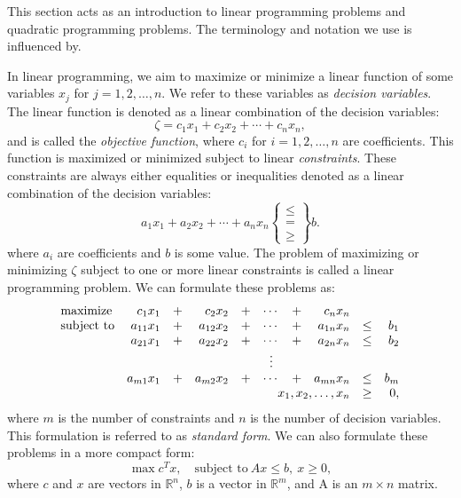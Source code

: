 This section acts as an introduction to linear programming problems and
quadratic programming problems.
The terminology and notation we use is influenced by\cite{vanderbei}.

In linear programming, we aim to maximize or minimize a linear function of
some variables $x_j$ for $j=1,2,\ldots,n$. We refer to these variables as
\textit{decision variables}. The linear function is denoted as a linear
combination of the decision variables:
\[
\zeta = c_1 x_1 + c_2 x_2 + \cdots + c_n x_n,
\]
and is called the \textit{objective function}, where $c_i$ for $i=1,2,\ldots,n$
are coefficients.
This function is maximized
or minimized subject to linear \textit{constraints}. These constraints are
always either equalities or inequalities denoted as a linear combination
of the decision variables:
\[
a_1x_1 + a_2 x_2 + \cdots + a_n x_n \left\{\begin{array}{c} \leq \\ = \\ \geq \end{array}\right\} b.
\]
where $a_i$ are coefficients and $b$ is some value.
The problem of maximizing or minimizing $\zeta$ subject to one or more
linear constraints is called a linear programming problem.
We can formulate these problems as:
\[
\begin{array}{lrcrcccrcr}
\textrm{maximize}   & c_1 x_1    &+& c_2 x_2    &+& \cdots &+& c_n x_n               \\
\textrm{subject to} & a_{11} x_1 &+& a_{12} x_2 &+& \cdots &+& a_{1n} x_n &\leq& b_1 \\
                    & a_{21} x_1 &+& a_{22} x_2 &+& \cdots &+& a_{2n} x_n &\leq& b_2 \\
                    &            & &            & & \vdots & &            &    &     \\
                    & a_{m1} x_1 &+& a_{m2} x_2 &+& \cdots &+& a_{mn} x_n &\leq& b_m \\
                    \multicolumn{8}{r}{x_1,x_2,\ldots,x_n} &\geq& 0,
\end{array}
\]
where $m$ is the number of constraints and $n$ is the number of decision variables.
This formulation is referred to as \textit{standard form}\cite{vanderbei}.
We can also formulate these problems in a more compact form:
\begin{equation}
\max{c^T x},\quad \textrm{subject to}~Ax \leq b, ~ x \geq 0, \label{eq:primal}
\end{equation}
where $c$ and $x$ are vectors in $\mathbb{R}^n$, $b$ is a vector in $\mathbb{R}^m$, and
A is an $m \times n$ matrix.

